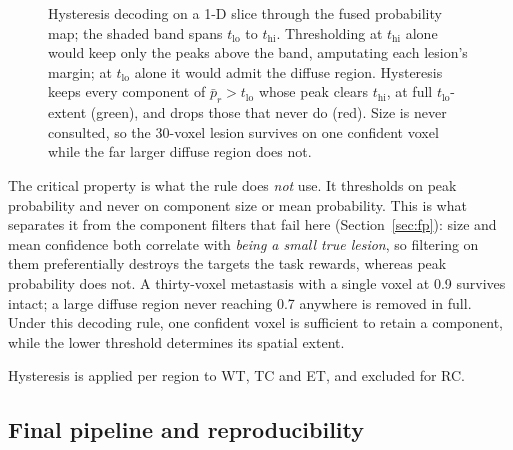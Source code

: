 \documentclass[runningheads]{llncs}
\begin{document}
\begin{figure}[t]
\caption{Hysteresis decoding on a 1-D slice through the fused probability map; the shaded band
spans $t_{\mathrm{lo}}$ to $t_{\mathrm{hi}}$. Thresholding at $t_{\mathrm{hi}}$ alone would keep only the peaks above the band,
amputating each lesion's margin; at $t_{\mathrm{lo}}$ alone it would admit the diffuse region. Hysteresis keeps
every component of $\bar{p}_r>t_{\mathrm{lo}}$ whose peak clears $t_{\mathrm{hi}}$, at full $t_{\mathrm{lo}}$-extent (green), and drops
those that never do (red). Size is never consulted, so the 30-voxel lesion survives on one
confident voxel while the far larger diffuse region does not.}
\label{fig:hyst}
\end{figure}

The critical property is what the rule does \emph{not} use. It thresholds on peak probability and
never on component size or mean probability. This is what separates it from the component filters
that fail here (Section~\ref{sec:fp}): size and mean confidence both correlate with \emph{being a
small true lesion}, so filtering on them preferentially destroys the targets the task rewards,
whereas peak probability does not. A thirty-voxel metastasis with a single voxel at 0.9 survives
intact; a large diffuse region never reaching 0.7 anywhere is removed in full. Under this decoding rule, one confident voxel is sufficient to retain a component, while the
lower threshold determines its spatial extent.

Hysteresis is applied per region to WT, TC and ET, and excluded for RC.

\subsection{Final pipeline and reproducibility}
\end{document}
